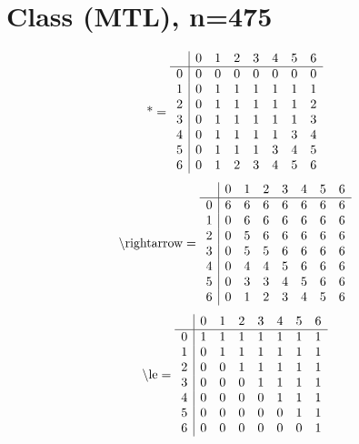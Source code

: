 \documentclass[11pt]{article}
\begin{document}
\section{Class (MTL), n=475}
\[\text{*} = 
\begin{array}{r | r r r r r r r}
 & 0 & 1 & 2 & 3 & 4 & 5 & 6 \\ \hline
0 & 0 & 0 & 0 & 0 & 0 & 0 & 0 \\
1 & 0 & 1 & 1 & 1 & 1 & 1 & 1 \\
2 & 0 & 1 & 1 & 1 & 1 & 1 & 2 \\
3 & 0 & 1 & 1 & 1 & 1 & 1 & 3 \\
4 & 0 & 1 & 1 & 1 & 1 & 3 & 4 \\
5 & 0 & 1 & 1 & 1 & 3 & 4 & 5 \\
6 & 0 & 1 & 2 & 3 & 4 & 5 & 6 \\
\end{array}
\]
\[\text{\textbackslash rightarrow} = 
\begin{array}{r | r r r r r r r}
 & 0 & 1 & 2 & 3 & 4 & 5 & 6 \\ \hline
0 & 6 & 6 & 6 & 6 & 6 & 6 & 6 \\
1 & 0 & 6 & 6 & 6 & 6 & 6 & 6 \\
2 & 0 & 5 & 6 & 6 & 6 & 6 & 6 \\
3 & 0 & 5 & 5 & 6 & 6 & 6 & 6 \\
4 & 0 & 4 & 4 & 5 & 6 & 6 & 6 \\
5 & 0 & 3 & 3 & 4 & 5 & 6 & 6 \\
6 & 0 & 1 & 2 & 3 & 4 & 5 & 6 \\
\end{array}
\]
\[\text{\textbackslash le} = 
\begin{array}{r | r r r r r r r}
 & 0 & 1 & 2 & 3 & 4 & 5 & 6 \\ \hline
0 & 1 & 1 & 1 & 1 & 1 & 1 & 1 \\
1 & 0 & 1 & 1 & 1 & 1 & 1 & 1 \\
2 & 0 & 0 & 1 & 1 & 1 & 1 & 1 \\
3 & 0 & 0 & 0 & 1 & 1 & 1 & 1 \\
4 & 0 & 0 & 0 & 0 & 1 & 1 & 1 \\
5 & 0 & 0 & 0 & 0 & 0 & 1 & 1 \\
6 & 0 & 0 & 0 & 0 & 0 & 0 & 1 \\
\end{array}
\]
\end{document}
